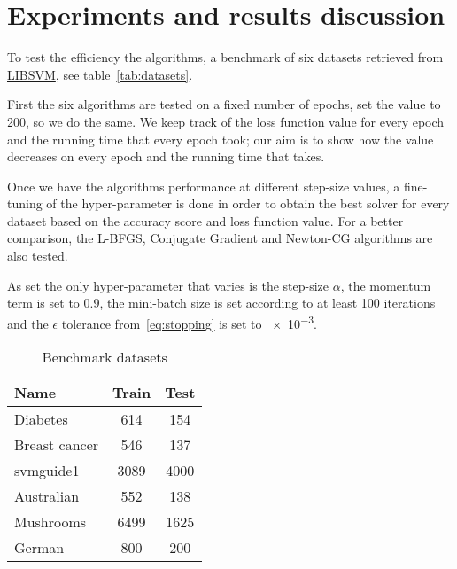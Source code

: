 \section{Experiments and results discussion}\label{sc:exp}




To test the efficiency the algorithms, a benchmark of six datasets retrieved from \href{https://www.csie.ntu.edu.tw/~cjlin/libsvmtools/datasets/}{LIBSVM}, see table~\vref{tab:datasets}.

First the six algorithms are tested on a fixed number of epochs, \textcite{fan_msl_2023} set the value to \num{200}, so we do the same. We keep track of the loss function value for every epoch and the running time that every epoch took; our aim is to show how the value decreases on every epoch and the running time that takes.

Once we have the algorithms performance at different step-size values, a fine-tuning of the hyper-parameter is done in order to obtain the best solver for every dataset based on the accuracy score and loss function value. For a better comparison, the L-BFGS, Conjugate Gradient and Newton-CG algorithms are also tested.

As set the only hyper-parameter that varies is the step-size $\alpha$, the momentum term is set to \num{0.9}, the mini-batch size is set according to at least \num{100} iterations and the $\epsilon$ tolerance from~\eqref{eq:stopping} is set to \num{e-3}.

\begin{table}
\centering
\caption{Benchmark datasets}
\label{tab:datasets}
\begin{tabular}{lSS}
\toprule
Name & {Train} & {Test} \\
\midrule
Diabetes & 614 & 154 \\
Breast cancer & 546 & 137 \\
svmguide1 & 3089 & 4000 \\
Australian & 552 & 138 \\
Mushrooms & 6499 & 1625 \\
German & 800 & 200 \\
\bottomrule
\end{tabular}
\end{table}


